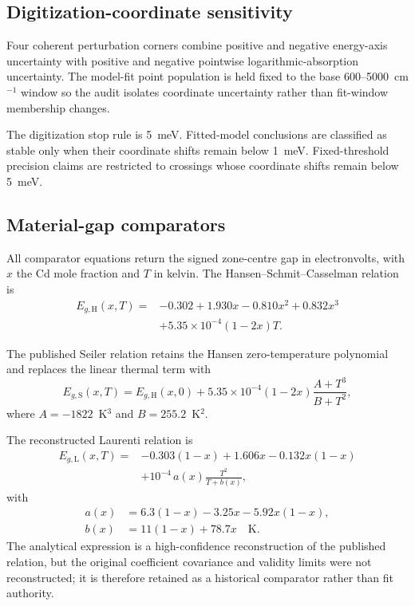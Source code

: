 \subsection{Digitization-coordinate sensitivity}
\label{sec:digitization}

Four coherent perturbation corners combine positive and negative energy-axis uncertainty with positive and negative pointwise logarithmic-absorption uncertainty. The model-fit point population is held fixed to the base 600--5000~cm$^{-1}$ window so the audit isolates coordinate uncertainty rather than fit-window membership changes.

The digitization stop rule is 5~meV. Fitted-model conclusions are classified as stable only when their coordinate shifts remain below 1~meV. Fixed-threshold precision claims are restricted to crossings whose coordinate shifts remain below 5~meV.

\subsection{Material-gap comparators}
\label{sec:comparators}

All comparator equations return the signed zone-centre gap in electronvolts, with $x$ the Cd mole fraction and $T$ in kelvin. The Hansen--Schmit--Casselman relation \cite{Hansen1982} is
\begin{equation}
\begin{split}
  E_{g,\mathrm{H}}(x,T) ={}& -0.302 + 1.930x - 0.810x^2 + 0.832x^3 \\
  &+ 5.35\times10^{-4}(1-2x)T.
\end{split}
  \label{eq:hansen}
\end{equation}

The published Seiler relation \cite{Seiler1990} retains the Hansen zero-temperature polynomial and replaces the linear thermal term with
\begin{equation}
  E_{g,\mathrm{S}}(x,T) = E_{g,\mathrm{H}}(x,0)
  + 5.35\times10^{-4}(1-2x)\frac{A+T^3}{B+T^2},
  \label{eq:seiler}
\end{equation}
where $A=-1822$~K$^3$ and $B=255.2$~K$^2$.

The reconstructed Laurenti relation \cite{Laurenti1990} is
\begin{equation}
\begin{split}
  E_{g,\mathrm{L}}(x,T) ={}& -0.303(1-x)+1.606x-0.132x(1-x) \\
  &+10^{-4}\,a(x)\frac{T^2}{T+b(x)},
\end{split}
  \label{eq:laurenti}
\end{equation}
with
\begin{align}
  a(x) &= 6.3(1-x)-3.25x-5.92x(1-x), \\
  b(x) &= 11(1-x)+78.7x \quad \text{K}.
\end{align}
The analytical expression is a high-confidence reconstruction of the published relation, but the original coefficient covariance and validity limits were not reconstructed; it is therefore retained as a historical comparator rather than fit authority.

